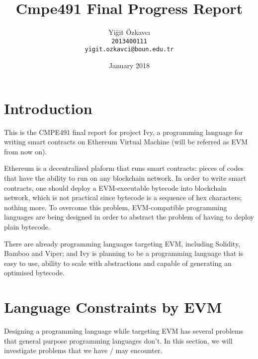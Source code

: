 \documentclass{article}
\title{Cmpe491 Final Progress Report}
\author{
  Yiğit Özkavcı \\
  \texttt{2013400111} \\
  \texttt{yigit.ozkavci@boun.edu.tr}
}
\date{January 2018}
\begin{document}

\maketitle

\tableofcontents


\section{Introduction}
\par 
\par This is the CMPE491 final report for project Ivy, a programming language for writing smart contracts on Ethereum Virtual Machine (will be referred as EVM from now on).
\par Ethereum is a decentralized plaform that runs smart contracts: pieces of codes that have the ability to run on any blockchain network. In order to write smart contracts, one should deploy a EVM-executable bytecode into blockchain network, which is not practical since bytecode is a sequence of hex characters; nothing more. To overcome this problem, EVM-compatible programming languages are being designed in order to abstract the problem of having to deploy plain bytecode. 
\par There are already programming languages targeting EVM, including Solidity\cite{solidity}, Bamboo\cite{bamboo} and Viper\cite{viper}; and Ivy is planning to be a programming language that is easy to use, ability to scale with abstractions and capable of generating an optimised bytecode.

\section{Language Constraints by EVM}
Designing a programming language while targeting EVM has several problems that general purpose programming languages don't. In this section, we will investigate problems that we have / may encounter.
\end{document}
